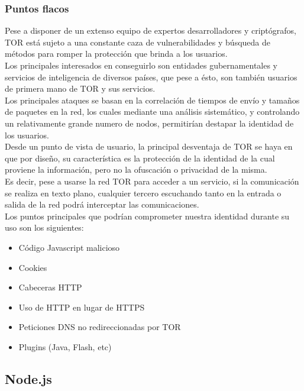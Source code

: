\subsubsection {Puntos flacos}

Pese a disponer de un extenso equipo de expertos desarrolladores y criptógrafos, TOR está sujeto a una constante caza de vulnerabilidades y búsqueda de métodos para romper la protección que brinda a los usuarios. \\
Los principales interesados en conseguirlo son entidades gubernamentales y servicios de inteligencia de diversos países, que pese a ésto, son también usuarios de primera mano de TOR y sus servicios. \\ 

Los principales ataques se basan en la correlación de tiempos de envío y tamaños de paquetes en la red, los cuales mediante una análisis sistemático, y controlando un relativamente grande numero de nodos, permitirían destapar la identidad de los usuarios. \\


Desde un punto de vista de usuario, la principal desventaja de TOR se haya en que por diseño, su característica es la protección de la identidad de la cual proviene la información, pero no la ofuscación o privacidad de la misma. \\ 
Es decir, pese a usarse la red TOR para acceder a un servicio, si la comunicación se realiza en texto plano, cualquier tercero escuchando tanto en la entrada o salida de la red podrá interceptar las comunicaciones. \\ 

Los puntos principales que podrían comprometer nuestra identidad durante su uso son los siguientes: \\

\begin{itemize}  
	\item  Código Javascript malicioso
	\item  Cookies
	\item  Cabeceras HTTP
	\item  Uso de HTTP en lugar de HTTPS
	\item Peticiones DNS no redireccionadas por TOR
	\item  Plugins (Java, Flash, etc)
\end{itemize}

\subsection {Node.js}

